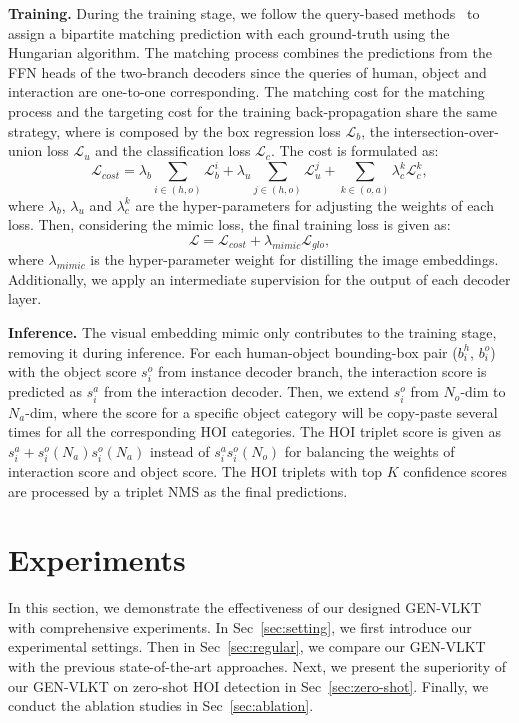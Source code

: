 \documentclass[10pt,twocolumn,letterpaper]{article}
\begin{document}
\vspace{1mm}\noindent\textbf{Training.} During the training stage, we follow the query-based methods~\cite{carion2020endtoend,zou2021_hoitrans,tamura2021qpic} to assign a bipartite matching prediction with each ground-truth using the Hungarian algorithm. The matching process combines the predictions from the FFN heads of the two-branch decoders since the queries of human, object and interaction are one-to-one corresponding. The matching cost for the matching process and the targeting cost for the training back-propagation share the same strategy, where is composed by the box regression loss $\mathcal{L}_b$, the intersection-over-union loss $\mathcal{L}_u$ and the classification loss $\mathcal{L}_c$. The cost is formulated as:
\begin{equation}
\mathcal{L}_{cost} = \lambda_b \sum_{i\in(h,o)} \mathcal{L}_b^i + \lambda_u \sum_{j\in(h,o)} \mathcal{L}_u^j + \sum_{k\in(o,a)} \lambda_c^k \mathcal{L}_c^k,
\label{eq02}
\end{equation}
where $\lambda_b$, $\lambda_u$ and $\lambda_c^k$ are the hyper-parameters for adjusting the weights of each loss. Then, considering the mimic loss, the final training loss is given as:
\begin{equation}
\mathcal{L} = \mathcal{L}_{cost} + \lambda_{mimic} \mathcal{L}_{glo},
\label{eq03}
\end{equation}
where $\lambda_{mimic}$ is the hyper-parameter weight for distilling the image embeddings. Additionally, we apply an intermediate supervision for the output of each decoder layer.

\vspace{1mm}\noindent\textbf{Inference.} The visual embedding mimic only contributes to the training stage, removing it during inference. For each human-object bounding-box pair ($b_i^h$, $b_i^o$) with the object score $s_i^o$ from instance decoder branch, the interaction score is predicted as $s_i^a$ from the interaction decoder. Then, we extend $s_i^o$ from $N_o$-dim to $N_a$-dim, where the score for a specific object category will be copy-paste several times for all the corresponding HOI categories. The HOI triplet score is given as $ s_i^a + s_i^o(N_a) s_i^o(N_a) $ instead of $ s_i^a s_i^o(N_o) $ for balancing the weights of interaction score and object score. The HOI triplets with top $K$ confidence scores are processed by a triplet NMS as the final predictions.

\vspace{-2mm}\section{Experiments}\vspace{-1mm}
In this section, we demonstrate the effectiveness of our designed GEN-VLKT with comprehensive experiments. In Sec~\ref{sec:setting}, we first introduce our experimental settings. Then in Sec~\ref{sec:regular}, we compare our GEN-VLKT with the previous state-of-the-art approaches. Next, we present the superiority of our GEN-VLKT on zero-shot HOI detection in Sec~\ref{sec:zero-shot}. Finally, we conduct the ablation studies in Sec~\ref{sec:ablation}.
\end{document}
